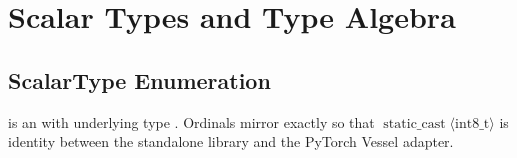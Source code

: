 
\section{Scalar Types and Type Algebra}

\subsection{ScalarType Enumeration}

\begin{definition}[ScalarType]
\label{def:scalartype}
 is an  with underlying type .
Ordinals mirror  exactly so that
$\operatorname{static\_cast}\langle\text{int8\_t}\rangle$ is identity between
the standalone library and the PyTorch Vessel adapter.
\end{definition}

